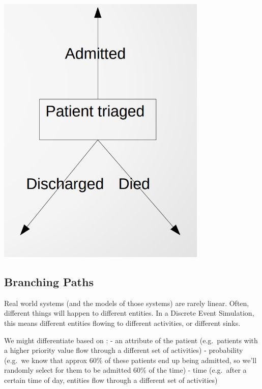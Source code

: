 \documentclass[
  letterpaper,
  DIV=11,
  numbers=noendperiod]{scrreprt}
\begin{document}
\includegraphics{images/sinks_simple.png}

\subsection{Branching Paths}\label{branching-paths}

Real world systems (and the models of those systems) are rarely linear.
Often, different things will happen to different entities. In a Discrete
Event Simulation, this means different entities flowing to different
activities, or different sinks.

We might differentiate based on : - an attribute of the patient
(e.g.~patients with a higher priority value flow through a different set
of activities) - probability (e.g.~we know that approx 60\% of these
patients end up being admitted, so we'll randomly select for them to be
admitted 60\% of the time) - time (e.g.~after a certain time of day,
entities flow through a different set of activities)
\end{document}

